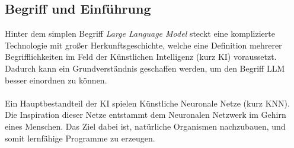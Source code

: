 \subsection{Begriff und Einführung}
Hinter dem simplen Begriff \textit{Large Language Model} steckt eine komplizierte Technologie mit großer Herkunftsgeschichte, welche eine Definition mehrerer Begrifflichkeiten im Feld der Künstlichen Intelligenz (kurz KI) voraussetzt. Dadurch kann ein Grundverständnis geschaffen werden, um den Begriff LLM besser einordnen zu können. \cite{seemannKuenstlicheIntelligenzLarge} \\\\ Ein Hauptbestandteil der KI spielen Künstliche Neuronale Netze (kurz \acs{KNN}). 
Die Inspiration dieser Netze entstammt dem Neuronalen Netzwerk im Gehirn eines Menschen. \cite*{seemannKuenstlicheIntelligenzLarge} Das Ziel dabei ist, natürliche Organismen nachzubauen, und somit lernfähige Programme zu erzeugen. 
